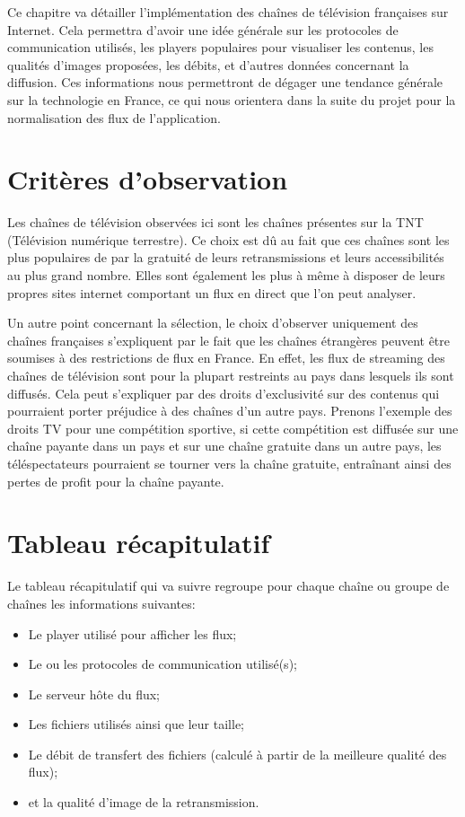 \documentclass{polytech/polytech}
\begin{document}
Ce chapitre va détailler l'implémentation des chaînes de télévision françaises sur Internet. Cela permettra d'avoir une idée générale sur les protocoles de communication utilisés, les players populaires pour visualiser les contenus, les qualités d'images proposées, les débits, et d'autres données concernant la diffusion. Ces informations nous permettront de dégager une tendance générale sur la technologie en France, ce qui nous orientera dans la suite du projet pour la normalisation des flux de l'application. 


\section{Critères d'observation}

Les chaînes de télévision observées ici sont les chaînes présentes sur la TNT (Télévision numérique terrestre). Ce choix est dû au fait que ces chaînes sont les plus populaires de par la gratuité de leurs retransmissions et leurs accessibilités au plus grand nombre. Elles sont également les plus à même à disposer de leurs propres sites internet comportant un flux en direct que l'on peut analyser.

Un autre point concernant la sélection, le choix d'observer uniquement des chaînes françaises s'expliquent par le fait que les chaînes étrangères peuvent être soumises à des restrictions de flux en France. En effet, les flux de streaming des chaînes de télévision sont pour la plupart restreints au pays dans lesquels ils sont diffusés. Cela peut s'expliquer par des droits d'exclusivité sur des contenus qui pourraient porter préjudice à des chaînes d'un autre pays. Prenons l'exemple des droits TV pour une compétition sportive, si cette compétition est diffusée sur une chaîne payante dans un pays et sur une chaîne gratuite dans un autre pays, les téléspectateurs pourraient se tourner vers la chaîne gratuite, entraînant ainsi des pertes de profit pour la chaîne payante. 

\section{Tableau récapitulatif}

Le tableau récapitulatif qui va suivre regroupe pour chaque chaîne ou groupe de chaînes les informations suivantes: 

\begin{itemize}
	\item Le player utilisé pour afficher les flux;
	\item Le ou les protocoles de communication utilisé(s);
	\item Le serveur hôte du flux;
	\item Les fichiers utilisés ainsi que leur taille;
	\item Le débit de transfert des fichiers (calculé à partir de la meilleure qualité des flux);
	\item et la qualité d'image de la retransmission.
\end{itemize}
\end{document}
